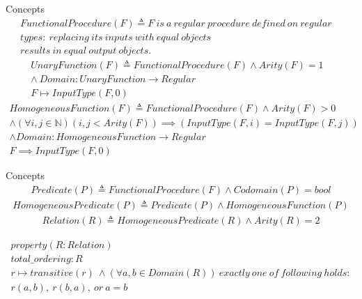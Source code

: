 \documentclass[10pt]{beamer}
\begin{document}
\begin{frame}{Concepts}
    \begin{align*}
        FunctionalProcedure(F) \triangleq F~is~a~regular~procedure~defined~on~regular~&\\
        types:~replacing~its~inputs~with~equal~objects~\\
        results~in~equal~output~objects.
    \end{align*}
    \begin{align*}
        UnaryFunction(F) \triangleq FunctionalProcedure(F) \land Arity(F) = 1 &\\
                \land~Domain: UnaryFunction \rightarrow Regular &\\
                F \mapsto InputType(F, 0)
    \end{align*}
    \begin{align*}
        HomogeneousFunction(F) \triangleq FunctionalProcedure(F) \land Arity(F) > 0\\
        \land (\forall i,j \in \mathbb{N})(i,j < Arity(F)) \implies (InputType(F, i) = InputType(F, j))\\
        \land Domain: HomogeneousFunction \rightarrow Regular\\
        F \implies InputType(F, 0)
    \end{align*}
\end{frame}

\begin{frame}{Concepts}
    \begin{align*}
        Predicate(P) \triangleq FunctionalProcedure(F) \land Codomain(P) = bool
    \end{align*}
    \begin{align*}
        HomogeneousPredicate(P) \triangleq Predicate(P) \land HomogeneousFunction(P)
    \end{align*}
    \begin{align*}
        Relation(R) \triangleq HomogeneousPredicate(R) \land Arity(R) = 2
    \end{align*}
\end{frame}
\begin{frame}{}
    \begin{align*}
        property(R: Relation)\\
        total\_ordering: R \\
                r \mapsto transitive(r)~\land(\forall a,b \in Domain(R))~exactly~one~of~following~holds:\\
            r(a, b),~r(b, a),~or~a = b\\
    \end{align*}
\end{frame}
\end{document}
